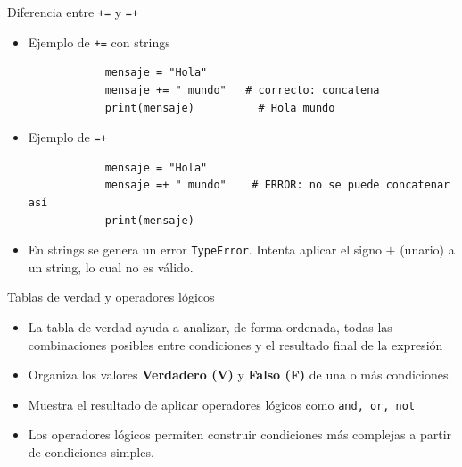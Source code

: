 \documentclass{beamer}
\begin{document}
    \begin{frame}[fragile,t]{Diferencia entre \texttt{+=} y \texttt{=+}}
        \begin{itemize}
            \item Ejemplo de \texttt{+=} con strings
            \begin{verbatim}
            mensaje = "Hola"
            mensaje += " mundo"   # correcto: concatena
            print(mensaje)          # Hola mundo
            \end{verbatim}
            \item Ejemplo de \texttt{=+}
            \begin{verbatim}
            mensaje = "Hola"
            mensaje =+ " mundo"    # ERROR: no se puede concatenar así
            print(mensaje)
            \end{verbatim}
            \item En strings se genera un error \texttt{TypeError}. Intenta 
            aplicar el signo $+$ (unario) a un string, lo cual no es válido.
        \end{itemize}
    \end{frame}

    \begin{frame}[fragile,t]{Tablas de verdad y operadores lógicos}
        \begin{itemize}
            \item La tabla de verdad ayuda a analizar, de forma ordenada, 
            todas las combinaciones posibles entre condiciones y el resultado final de la expresión
            \item Organiza los valores \textbf{Verdadero (V)} y \textbf{Falso (F)} de una o más condiciones.
            \item Muestra el resultado de aplicar operadores lógicos como \texttt{and, or, not}
            \item Los operadores lógicos permiten construir condiciones más complejas a partir 
            de condiciones simples.
        \end{itemize}
    \end{frame}
\end{document}
